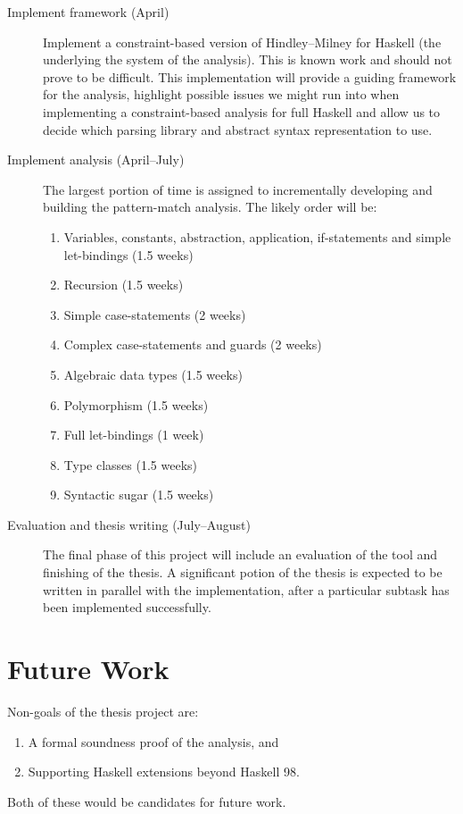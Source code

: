 \documentclass[a4paper]{report}
\begin{document}
\begin{description}
\item[Implement framework (April)] Implement a constraint-based version of Hindley--Milney for Haskell (the underlying the system of the analysis). This is known work \cite{Odersky:1999:TIC:308181.308203,DBLP:journals/entcs/HageH09} and should not prove to be difficult. This implementation will provide a guiding framework for the analysis, highlight possible issues we might run into when implementing a constraint-based analysis for full Haskell and allow us to decide which parsing library and abstract syntax representation to use.
\item[Implement analysis (April--July)] The largest portion of time is assigned to incrementally developing and building the pattern-match analysis. The likely order will be:
\begin{enumerate}
\item Variables, constants, abstraction, application, if-statements and simple let-bindings (1.5 weeks)
\item Recursion (1.5 weeks)
\item Simple case-statements (2 weeks)
\item Complex case-statements and guards (2 weeks)
\item Algebraic data types (1.5 weeks)
\item Polymorphism (1.5 weeks)
\item Full let-bindings (1 week)
\item Type classes (1.5 weeks)
\item Syntactic sugar (1.5 weeks)
\end{enumerate}
\item[Evaluation and thesis writing (July--August)] The final phase of this project will include an evaluation of the tool and finishing of the thesis. A significant potion of the thesis is expected to be written in parallel with the implementation, after a particular subtask has been implemented successfully.
\end{description}

\chapter{Future Work}

Non-goals of the thesis project are:
\begin{enumerate}
\item A formal soundness proof of the analysis, and
\item Supporting Haskell extensions beyond Haskell 98.
\end{enumerate}
Both of these would be candidates for future work.



\end{document}
